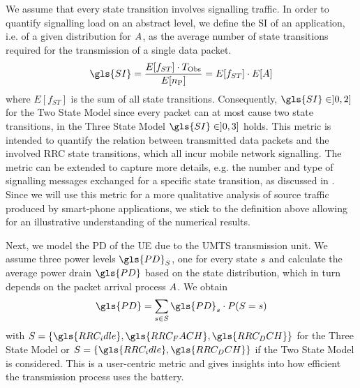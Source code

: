 \newcommand{\fStateTransitions}{E[f_{ST}]\xspace}

We assume that every state transition involves signalling traffic.
In order to quantify signalling load on an abstract level, we define the \gls{SI} of an application, i.e. of a given distribution for \(A\), as the average number of state transitions required for the transmission of a single data packet.
\begin{equation}
\gls{SI} = \frac{\fStateTransitions \cdot \ObservationInterval}{E[\NObservedPackets]}\\
= \fStateTransitions \cdot E[\PacketIAT]
\label{eq::sigIntensity}
\end{equation}
where \(\fStateTransitions\) is the sum of all state transitions.
Consequently, \(\gls{SI} \in ]0,2]\) for the Two State Model since every packet can at most cause two state transitions, in the Three State Model \(\gls{SI} \in]0,3]\) holds.
This metric is intended to quantify the relation between transmitted data packets and the involved \gls{RRC} state transitions, which all incur mobile network signalling.
The metric can be extended to capture more details, e.g. the number and type of signalling messages exchanged for a specific state transition, as discussed in .
Since we will use this metric for a more qualitative analysis of source traffic produced by smart-phone applications, we stick to the definition above allowing for an illustrative understanding of the numerical results.

Next, we model the \gls{PD} of the \gls{UE} due to the \gls{UMTS} transmission unit.
We assume three power levels \(\gls{PD}_{\RRCState}\), one for every state \(s\) and calculate the average power drain \(\gls{PD}\) based on the state distribution, which in turn depends on the packet arrival process \(A\).
We obtain
\begin{equation}
\gls{PD} = \sum_{\RRCStateRealization\in\RRCState} \gls{PD}_{\RRCStateRealization} \cdot P(\RRCState=\RRCStateRealization)
\label{eq::powerdrain}
\end{equation}
with \(\RRCState = \{\gls{RRC_idle},\gls{RRC_FACH},\gls{RRC_DCH}\}\) for the Three State Model or \(\RRCState = \{\gls{RRC_idle},\gls{RRC_DCH}\}\) if the Two State Model is considered.
This is a user-centric metric and gives insights into how efficient the transmission process uses the battery.
